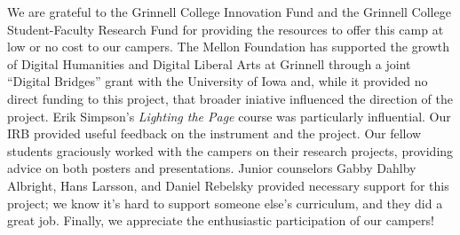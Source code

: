\begin{acks}
{\small
We are grateful to the Grinnell College Innovation Fund and the
Grinnell College Student-Faculty Research Fund for providing the
resources to offer this camp at low or no cost to our campers.  The
Mellon Foundation has supported the growth of Digital Humanities
and Digital Liberal Arts
at Grinnell through a joint ``Digital Bridges'' grant with the
University of Iowa and, while it provided no direct funding to this
project, that broader iniative influenced the direction of the
project.  Erik Simpson's \textit{Lighting the Page} course was particularly
influential.  Our IRB provided useful feedback on the instrument
and the project.  Our fellow students graciously worked with the
campers on their research projects, providing advice on both posters
and presentations.  Junior counselors Gabby Dahlby Albright, Hans
Larsson, and Daniel Rebelsky provided necessary support for this
project; we know it's hard to support someone else's curriculum,
and they did a great job.  Finally, we appreciate the enthusiastic
participation of our campers!
} 
\end{acks}
